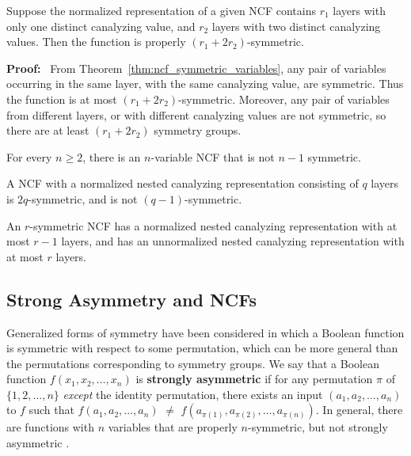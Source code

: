 \begin{theorem}\label{thm:ncf_r_symmetric}
Suppose the normalized representation of a given NCF contains 
$r_1$ layers with only one distinct canalyzing value,
and $r_2$ layers with two distinct canalyzing values.
Then the function is properly $(r_1 + 2 r_2)$-symmetric.
\end{theorem}
\noindent
\textbf{Proof:}~
From Theorem~\ref{thm:ncf_symmetric_variables}, 
any pair of variables occurring in the same layer, with the same canalyzing value,
are symmetric.
Thus the function is at most $(r_1 + 2 r_2)$-symmetric.
Moreover, any pair of variables from different layers, or with different canalyzing values
are not symmetric, so there are at least $(r_1 + 2 r_2)$ symmetry groups.
\QED

\begin{corollary}\label{cor:ncf_not_rsymm}
For every $n \geq 2$, there is an $n$-variable NCF that is not $n-1$ symmetric.
\end{corollary}

\begin{corollary}\label{cor:ncf_r_symmetric_layers}
A NCF with a normalized nested canalyzing representation consisting
of $q$ layers is $2q$-symmetric, and is not $(q-1)$-symmetric.

An $r$-symmetric NCF has a normalized nested canalyzing representation
with at most $r-1$ layers, and has an unnormalized nested canalyzing
representation with at most $r$ layers.  \end{corollary}

\subsection{Strong Asymmetry and NCFs}
\label{sse:strong_asym_ncf}

Generalized forms of symmetry have been considered \cite{KS-2000}
in which a Boolean function is symmetric with respect to some permutation,
which can be more general than the permutations corresponding to symmetry groups.
We say that a Boolean function $f(x_1, x_2, \ldots, x_n)$ 
is \textbf{strongly asymmetric}
if for any permutation $\pi$ of $\{1, 2, \ldots, n\}$
\emph{except} the identity permutation,
there exists an input $(a_1, a_2, \ldots,  a_n)$ 
to $f$ such that $f(a_1, a_2, \ldots, a_n)$ $\neq$  
$f(a_{\pi(1)}, a_{\pi(2)}, \ldots, a_{\pi(n)})$.
In general, there are functions with $n$ variables that are properly
$n$-symmetric, but not strongly asymmetric \cite{KS-2000}.

